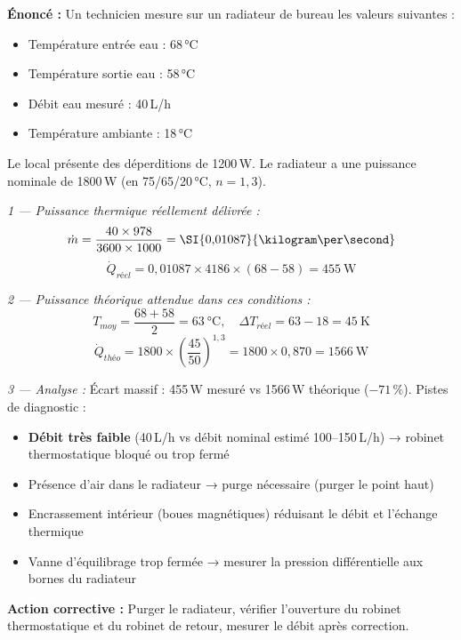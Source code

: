 \begin{exemple}[title=Diagnostic d'un radiateur sous-performant]
\textbf{Énoncé :} Un technicien mesure sur un radiateur de bureau les valeurs suivantes :
\begin{itemize}
  \item Température entrée eau : 68\,°C
  \item Température sortie eau : 58\,°C
  \item Débit eau mesuré : 40\,L/h
  \item Température ambiante : 18\,°C
\end{itemize}
Le local présente des déperditions de 1200\,W. Le radiateur a une puissance nominale de 1800\,W (en 75/65/20\,°C, $n = 1{,}3$).

\textit{1 — Puissance thermique réellement délivrée :}
\[
  \dot{m} = \frac{40 \times 978}{3600 \times 1000} = \SI{0{,}01087}{\kilogram\per\second}
\]
\[
  \dot{Q}_{réel} = 0{,}01087 \times 4186 \times (68 - 58) = \SI{455}{\watt}
\]

\textit{2 — Puissance théorique attendue dans ces conditions :}
\[
  T_{moy} = \frac{68 + 58}{2} = \SI{63}{\celsius}, \quad \Delta T_{réel} = 63 - 18 = \SI{45}{\kelvin}
\]
\[
  \dot{Q}_{théo} = 1800 \times \left(\frac{45}{50}\right)^{1{,}3} = 1800 \times 0{,}870 = \SI{1566}{\watt}
\]

\textit{3 — Analyse :} Écart massif : 455\,W mesuré vs 1566\,W théorique ($-71\,\%$). Pistes de diagnostic :
\begin{itemize}
  \item \textbf{Débit très faible} (40\,L/h vs débit nominal estimé 100–150\,L/h) → robinet thermostatique bloqué ou trop fermé
  \item Présence d'air dans le radiateur → purge nécessaire (purger le point haut)
  \item Encrassement intérieur (boues magnétiques) réduisant le débit et l'échange thermique
  \item Vanne d'équilibrage trop fermée → mesurer la pression différentielle aux bornes du radiateur
\end{itemize}

\textbf{Action corrective :} Purger le radiateur, vérifier l'ouverture du robinet thermostatique et du robinet de retour, mesurer le débit après correction.
\end{exemple}

